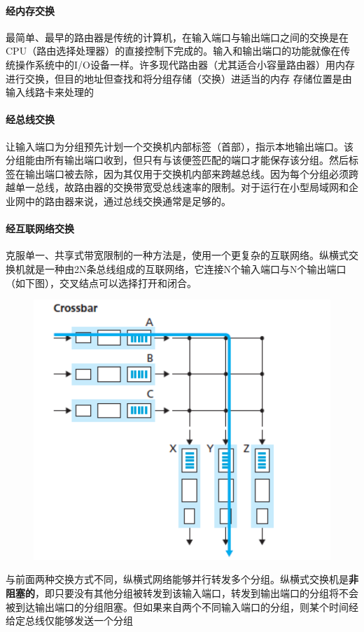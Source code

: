 \documentclass[]{report}
\begin{document}
			\paragraph{经内存交换}
			最简单、最早的路由器是传统的计算机，在输入端口与输出端口之间的交换是在CPU（路由选择处理器）的直接控制下完成的。输入和输出端口的功能就像在传统操作系统中的I/O设备一样。许多现代路由器（尤其适合小容量路由器）用内存进行交换，但目的地址但查找和将分组存储（交换）进适当的内存 存储位置是由输入线路卡来处理的
			\paragraph{经总线交换}
			让输入端口为分组预先计划一个交换机内部标签（首部），指示本地输出端口。该分组能由所有输出端口收到，但只有与该便签匹配的端口才能保存该分组。然后标签在输出端口被去除，因为其仅用于交换机内部来跨越总线。因为每个分组必须跨越单一总线，故路由器的交换带宽受总线速率的限制。对于运行在小型局域网和企业网中的路由器来说，通过总线交换通常是足够的。
			\paragraph{经互联网络交换}
			克服单一、共享式带宽限制的一种方法是，使用一个更复杂的互联网络。纵横式交换机就是一种由2N条总线组成的互联网络，它连接N个输入端口与N个输出端口（如下图），交叉结点可以选择打开和闭合。
			\begin{figure}
				\centering
				\begin{minipage}{40em}
					\centering
					\includegraphics[scale = 0.5]{images/crossbar_in_router.png}
				\end{minipage}
			\end{figure}\par
			与前面两种交换方式不同，纵横式网络能够并行转发多个分组。纵横式交换机是\textbf{非阻塞的}，即只要没有其他分组被转发到该输入端口，转发到输出端口的分组将不会被到达输出端口的分组阻塞。但如果来自两个不同输入端口的分组，则某个时间经给定总线仅能够发送一个分组
\end{document}
